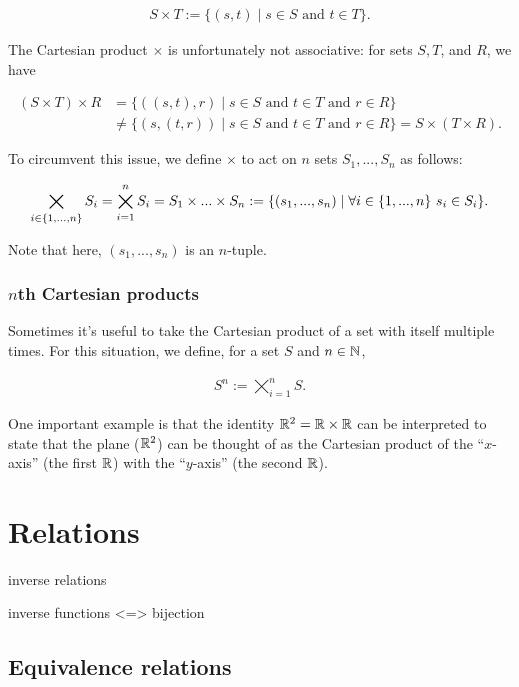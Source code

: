 \begin{align*}
    S \times T := \{(s, t) \mid s \in S \text{ and } t \in T\}.
\end{align*}

The Cartesian product $\times$ is unfortunately not associative: for sets $S, T$, and $R$, we have

\begin{align*}
    (S \times T) \times R &= \{ ((s, t), r) \mid s \in S \text{ and } t \in T \text{ and } r \in R\} \\ &\neq \{(s, (t, r)) \mid s \in S \text{ and } t \in T \text{ and } r \in R\} = S \times (T \times R).
\end{align*}

To circumvent this issue, we define $\times$ to act on $n$ sets $S_1, ..., S_n$ as follows:

\begin{align*}
    \bigtimes_{i \in \{1, ..., n\}} S_i = \bigtimes_{i = 1}^n S_i = S_1 \times ... \times S_n := \{(s_1, ..., s_n) \mid \forall i \in \{1, ..., n\} \text{ } s_i \in S_i\}.
\end{align*}

Note that here, $(s_1, ..., s_n)$ is an $n$-tuple.

\subsubsection*{$n$th Cartesian products}

Sometimes it's useful to take the Cartesian product of a set with itself multiple times. For this situation, we define, for a set $S$ and $n \in \mathbb{N}$,

\begin{align*}
    S^n := \bigtimes_{i = 1}^n S.
\end{align*}

One important example is that the identity $\mathbb{R}^2 = \mathbb{R} \times \mathbb{R}$ can be interpreted to state that the plane ($\mathbb{R}^2$) can be thought of as the Cartesian product of the ``$x$-axis'' (the first $\mathbb{R}$) with the ``$y$-axis'' (the second $\mathbb{R}$).

\newpage

\section{Relations}

inverse relations

inverse functions <=> bijection

\subsection*{Equivalence relations}

